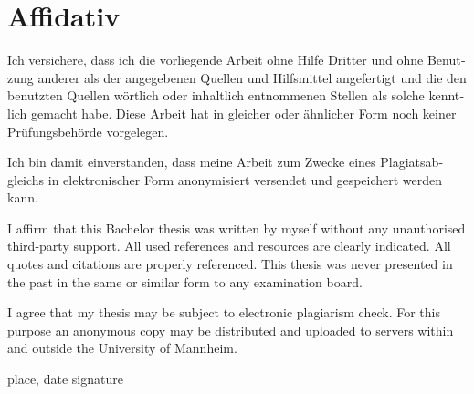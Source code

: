 

\chapter{Affidativ}
\thispagestyle{empty}

\begin{german}
	Ich versichere, dass ich die vorliegende Arbeit ohne Hilfe Dritter und ohne Benutzung anderer
	als der angegebenen Quellen und Hilfsmittel angefertigt und die den benutzten Quellen
	wörtlich oder inhaltlich entnommenen Stellen als solche kenntlich gemacht habe. Diese Arbeit
	hat in gleicher oder ähnlicher Form noch keiner Prüfungsbehörde vorgelegen.
	
	Ich bin damit einverstanden, dass meine Arbeit zum Zwecke eines Plagiatsabgleichs in
	elektronischer Form anonymisiert versendet und gespeichert werden kann.
\end{german}

\vspace{\baselineskip}


\noindent I affirm that this Bachelor thesis was written by myself without any unauthorised third-party support.
All used references and resources are clearly indicated. All quotes and citations are properly referenced.
This thesis was never presented in the past in the same or similar form to any examination board.

I agree that my thesis may be subject to electronic plagiarism check. 
For this purpose an anonymous copy may be distributed and uploaded to servers within and outside the University of Mannheim.

\vspace{4\baselineskip}
\begin{center}
\parbox{.8\textwidth}{place, date \hfill signature}
\end{center}

\endinput
